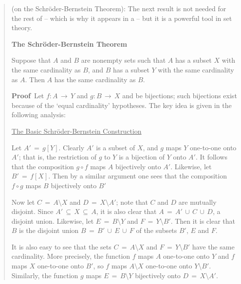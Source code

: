 \begin{quotation}
{\footnotesize \underline{\Note} (on the Schr\"{o}der-Bernstein Theorem): 
    The next result is not needed for the rest of {\TheseNotes} -- which is why it appears in a \Note -- but it is a powerful tool in set theory.

\V

        {\bf The Schr\"{o}der-Bernstein Theorem}

\V

        Suppose that $A$ and $B$ are nonempty sets such that $A$ has a subset $X$ with the same cardinality as $B$,
    and $B$ has a subset $Y$ with the same cardinality as $A$.
    Then $A$ has the same cardinality as $B$.

\V

        {\bf Proof}\,  Let $f:A \,{\rightarrow}\, Y$ and $g:B \,{\rightarrow}\, X$ and be bijections;
    such bijections exist because of the `equal cardinality' hypotheses.
    The key idea is given in the following analysis:

\V

       \underline{The Basic Schr\"{o}der-Bernstein Construction}

        Let $A' \,=\, g[Y]$. Clearly $A'$ is a subset of $X$, and $g$ maps $Y$ one-to-one onto $A'$;
    that is, the restriction of $g$ to $Y$ is a bijection of $Y$ onto $A'$. It follows that the composition $g{\circ}f$ maps $A$ bijectively onto $A'$.
    Likewise, let $B' \,=\, f[X]$. Then by a similar argument one sees that the composition $f{\circ}g$ maps $B$ bijectively onto $B'$

        Now let $C \,=\, A{\setminus}X$ and $D \,=\, X{\setminus}A'$; note that $C$ and $D$ are mutually disjoint.
    Since $A' \,{\subseteq}\, X \,{\subseteq}\, A$, it is also clear that $A \,=\, A'\,{\cup}\,C\,{\cup}\,D$, a disjoint union.
    Likewise, let $E \,=\, B{\setminus}Y$ and $F \,=\, Y{\setminus}B'$. Then it is clear that $B$ is the disjoint union $B \,=\, B'\,{\cup}\,E\,{\cup}\,F$ of the subsets $B'$, $E$ and $F$.

        It is also easy to see that the sets $C \,=\, A{\setminus}X$ and $F \,=\, Y{\setminus}B'$ have the same cardinality.
    More precisely, the function $f$ maps $A$ one-to-one onto $Y$ and $f$ maps $X$ one-to-one onto $B'$,
    so $f$ maps $A{\setminus}X$ one-to-one onto $Y{\setminus}B'$.
    Similarly, the function $g$ maps $E \,=\, B{\setminus}Y$ bijectively onto $D \,=\, X{\setminus}A'$.

}
\end{quotation}

